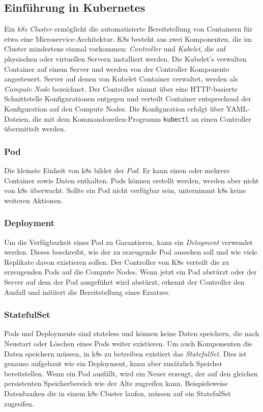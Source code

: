\subsection{Einführung in Kubernetes}

Ein \textit{\ac{k8s} Cluster} ermöglicht die automatisierte Bereitstellung von Containern für etwa eine Microservice-Architektur.
K8s besteht aus zwei Komponenten, die im Cluster mindestens einmal vorkommen: \textit{Controller} und \textit{Kubelet}, die auf physischen oder virtuellen Servern installiert werden.
Die Kubelet's verwalten Container auf einem Server und werden von der Controller Komponente angesteuert.
Server auf denen von Kubelet Container verwaltet, werden als \textit{Compute Node} bezeichnet.
Der Controller nimmt über eine HTTP-basierte Schnittstelle Konfigurationen entgegen und verteilt Container entsprechend der Konfiguration auf den Compute Nodes.
Die Konfiguration erfolgt über YAML-Dateien, die mit dem Kommandozeilen-Programm \texttt{kubectl} an einen Controller übermittelt werden.

\subsubsection{Pod}
Die kleinste Einheit von \ac{k8s} bildet der \textit{Pod}.
Er kann einen oder mehrere Container sowie Daten enthalten.
Pods können erstellt werden, werden aber nicht von \ac{k8s} überwacht.
Sollte ein Pod nicht verfügbar sein, unternimmt \ac{k8s} keine weiteren Aktionen.

\subsubsection{Deployment}
Um die Verfügbarkeit eines Pod zu Garantieren, kann ein \textit{Deloyment} verwendet werden.
Dieses beschreibt, wie der zu erzeugende Pod aussehen soll und wie viele Replikate davon existieren sollen.
Der Controller von K8s verteilt die zu erzeugenden Pods auf die Compute Nodes.
Wenn jetzt ein Pod abstürzt oder der Server auf dem der Pod ausgeführt wird abstürzt, erkennt der Controller den Ausfall und initiiert die Bereitstellung eines Ersatzes.

\subsubsection{StatefulSet}
Pods und Deployments sind stateless und können keine Daten speichern, die nach Neustart oder Löschen eines Pods weiter existieren.
Um auch Komponenten die Daten speichern müssen, in \ac{k8s} zu betreiben existiert das \textit{StatefulSet}.
Dies ist genauso aufgebaut wie ein Deployment, kann aber zusätzlich Speicher bereitstellen.
Wenn ein Pod ausfällt, wird ein Neuer erzeugt, der auf den gleichen persistenten Speicherbereich wie der Alte zugreifen kann.
Beispielsweise Datenbanken die in einem \ac{k8s} Cluster laufen, müssen auf ein StatefulSet zugreifen.

